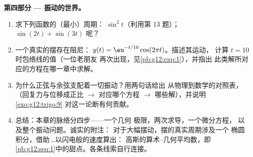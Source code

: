 \begin{problem}
\medskip
\noindent\textbf{第四部分 --- 振动的世界。}
\begin{enumerate}[resume]
  \item 求下列函数的（最小）周期：
        $\sin^2 t$（利用第 13 题）；
        $\sin(2t) + \sin(3t)$ 呢？
  \item 一个真实的摆存在阻尼：
        $y(t) = \eu^{-t/10}\cos(2\pi t)$。描述其运动，
        计算 $t = 10$ 时包络线的值（一位老朋友
        再次出现，见\cref{pb:g12:exp:1}），并指出
        此类解所对应的方程在哪一章中求解。
  \item 为什么正弦与余弦支配着一切振动？用两句话给出
        从物理到数学的对照表，
        （回复力与位移成正比
        $\rightarrow$ 对应哪个方程 $\rightarrow$
        哪些解），并说明\cref{exo:g12:trigo:9}
        对这一论断有何贡献。
  \item 总结：本章的脉络分四步——一个几何
        极限，两次求导，一个微分方程，
        以及整个振动问题。诚实的附注：
        对于大幅摆动，摆的真实周期涉及一个
        椭圆积分，借助\,\dots 以闪电般的速度算出：
        高斯的算术--几何平均数，即
        \cref{pb:g12:seq:1}中的甜点。各条线索自行连接。
\end{enumerate}
\end{problem}
